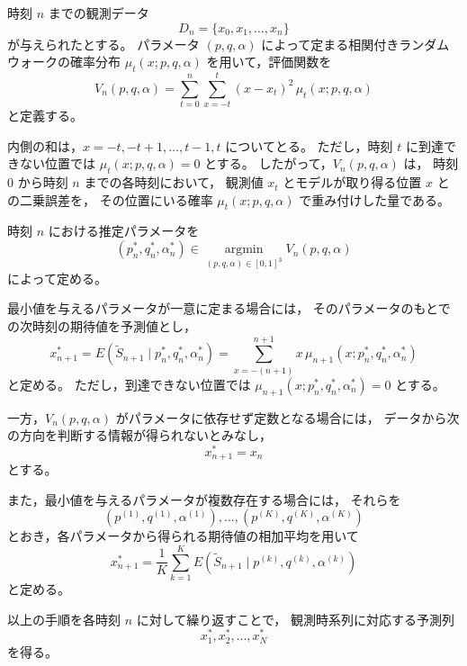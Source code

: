 \documentclass[a4j,dvipdfmx]{jsarticle}
\theoremstyle{plainnote}
\begin{document}
時刻 $n$ までの観測データ
\[
  D_n=\{x_0,x_1,\ldots,x_n\}
\]
が与えられたとする。
パラメータ $(p,q,\alpha)$ によって定まる相関付きランダムウォークの確率分布
$\mu_t(x;p,q,\alpha)$ を用いて，評価関数を
\begin{equation}
  V_n(p,q,\alpha)
  =
  \sum_{t=0}^{n}
  \sum_{x=-t}^{t}
  (x-x_t)^2\,
  \mu_t(x;p,q,\alpha)
  \label{eq:model_Vn}
\end{equation}
と定義する。

内側の和は，$x=-t,-t+1,\ldots,t-1,t$ についてとる。
ただし，時刻 $t$ に到達できない位置では
$\mu_t(x;p,q,\alpha)=0$ とする。
したがって，$V_n(p,q,\alpha)$ は，
時刻 $0$ から時刻 $n$ までの各時刻において，
観測値 $x_t$ とモデルが取り得る位置 $x$ との二乗誤差を，
その位置にいる確率 $\mu_t(x;p,q,\alpha)$ で重み付けした量である。

時刻 $n$ における推定パラメータを
\begin{equation}
  (p_n^\ast,q_n^\ast,\alpha_n^\ast)
  \in
  \operatorname*{argmin}_{(p,q,\alpha)\in[0,1]^3}
  V_n(p,q,\alpha)
  \label{eq:model_argmin}
\end{equation}
によって定める。

最小値を与えるパラメータが一意に定まる場合には，
そのパラメータのもとでの次時刻の期待値を予測値とし，
\begin{equation}
  x_{n+1}^{\ast}
  =
  E(\tilde{S}_{n+1}\mid p_n^\ast,q_n^\ast,\alpha_n^\ast)
  =
  \sum_{x=-(n+1)}^{n+1}
  x\,\mu_{n+1}(x;p_n^\ast,q_n^\ast,\alpha_n^\ast)
  \label{eq:model_prediction}
\end{equation}
と定める。
ただし，到達できない位置では
$\mu_{n+1}(x;p_n^\ast,q_n^\ast,\alpha_n^\ast)=0$ とする。

一方，$V_n(p,q,\alpha)$ がパラメータに依存せず定数となる場合には，
データから次の方向を判断する情報が得られないとみなし，
\begin{equation}
  x_{n+1}^{\ast}=x_n
  \label{eq:model_prediction_const}
\end{equation}
とする。

また，最小値を与えるパラメータが複数存在する場合には，
それらを
\[
  (p^{(1)},q^{(1)},\alpha^{(1)}),\ldots,
  (p^{(K)},q^{(K)},\alpha^{(K)})
\]
とおき，各パラメータから得られる期待値の相加平均を用いて
\begin{equation}
  x_{n+1}^{\ast}
  =
  \frac{1}{K}
  \sum_{k=1}^{K}
  E(\tilde{S}_{n+1}\mid p^{(k)},q^{(k)},\alpha^{(k)})
  \label{eq:model_prediction_multiple}
\end{equation}
と定める。

以上の手順を各時刻 $n$ に対して繰り返すことで，
観測時系列に対応する予測列
\[
  x_1^\ast,x_2^\ast,\ldots,x_N^\ast
\]
を得る。
\newpage
\end{document}
